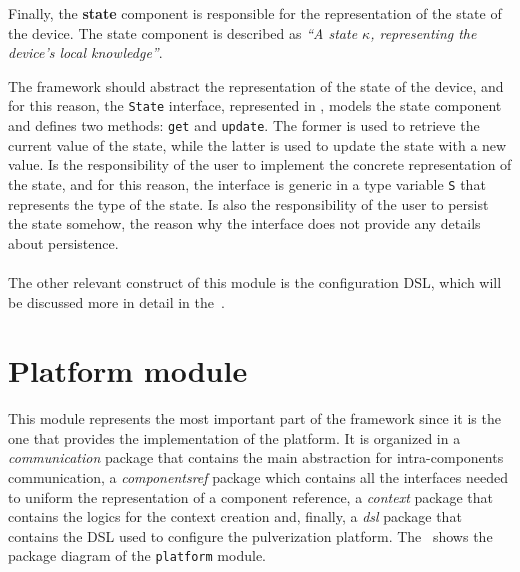 Finally, the \textbf{state} component is responsible for the representation of the state of the device.
The state component is described as \textit{``A state $\kappa$, representing the device's local knowledge''}.

The framework should abstract the representation of the state of the device, and for this reason, the \texttt{State} interface, represented in
, models the state component and defines two methods: \texttt{get} and \texttt{update}.
The former is used to retrieve the current value of the state, while the latter is used to update the state with a new value.
Is the responsibility of the user to implement the concrete representation of the state, and for this reason, the interface is generic in a type
variable \texttt{S} that represents the type of the state. Is also the responsibility of the user to persist the state somehow, the reason why the
interface does not provide any details about persistence.



\paragraph*{}

The other relevant construct of this module is the configuration DSL, which will be discussed more in detail in the~.


\section{Platform module}
\label{sec:platform-module-impl}

This module represents the most important part of the framework since it is the one that provides the implementation of the platform.
It is organized in a \emph{communication} package that contains the main abstraction for intra-components communication, a \emph{componentsref}
package which contains all the interfaces needed to uniform the representation of a component reference, a \emph{context} package that contains the
logics for the context creation and, finally, a \emph{dsl} package that contains the DSL used to configure the pulverization platform.
The~ shows the package diagram of the \texttt{platform} module.

